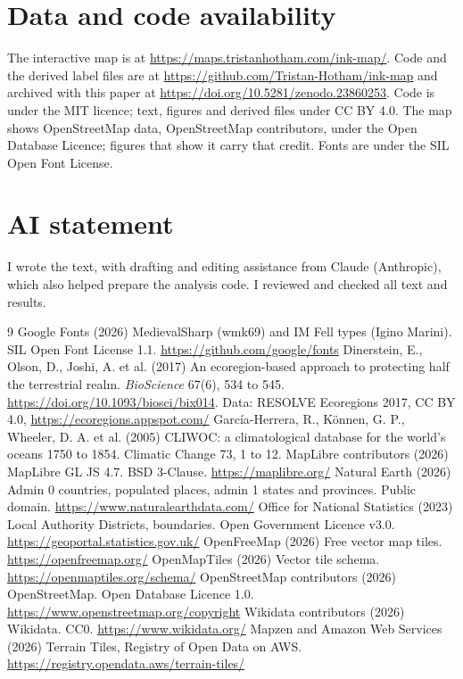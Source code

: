 \documentclass[11pt,a4paper]{article}
\begin{document}
\section*{Data and code availability}
The interactive map is at \url{https://maps.tristanhotham.com/ink-map/}. Code and the derived label files are at \url{https://github.com/Tristan-Hotham/ink-map} and archived with this paper at \url{https://doi.org/10.5281/zenodo.23860253}. Code is under the MIT licence; text, figures and derived files under CC BY 4.0. The map shows OpenStreetMap data, \textcopyright{} OpenStreetMap contributors, under the Open Database Licence; figures that show it carry that credit. Fonts are under the SIL Open Font License.

\section*{AI statement}
I wrote the text, with drafting and editing assistance from Claude (Anthropic), which also helped prepare the analysis code. I reviewed and checked all text and results.

\begin{thebibliography}{9}
 Google Fonts (2026) MedievalSharp (wmk69) and IM Fell types (Igino Marini). SIL Open Font License 1.1. \url{https://github.com/google/fonts}
 Dinerstein, E., Olson, D., Joshi, A. et al. (2017) An ecoregion-based approach to protecting half the terrestrial realm. \emph{BioScience} 67(6), 534 to 545. \url{https://doi.org/10.1093/biosci/bix014}. Data: RESOLVE Ecoregions 2017, CC BY 4.0, \url{https://ecoregions.appspot.com/}
 Garc\'ia-Herrera, R., K\"onnen, G. P., Wheeler, D. A. et al. (2005) CLIWOC: a climatological database for the world's oceans 1750 to 1854. Climatic Change 73, 1 to 12.
 MapLibre contributors (2026) MapLibre GL JS 4.7. BSD 3-Clause. \url{https://maplibre.org/}
 Natural Earth (2026) Admin 0 countries, populated places, admin 1 states and provinces. Public domain. \url{https://www.naturalearthdata.com/}
 Office for National Statistics (2023) Local Authority Districts, boundaries. Open Government Licence v3.0. \url{https://geoportal.statistics.gov.uk/}
 OpenFreeMap (2026) Free vector map tiles. \url{https://openfreemap.org/}
 OpenMapTiles (2026) Vector tile schema. \url{https://openmaptiles.org/schema/}
 OpenStreetMap contributors (2026) OpenStreetMap. Open Database Licence 1.0. \url{https://www.openstreetmap.org/copyright}
 Wikidata contributors (2026) Wikidata. CC0. \url{https://www.wikidata.org/}
 Mapzen and Amazon Web Services (2026) Terrain Tiles, Registry of Open Data on AWS. \url{https://registry.opendata.aws/terrain-tiles/}
\end{thebibliography}
\end{document}
